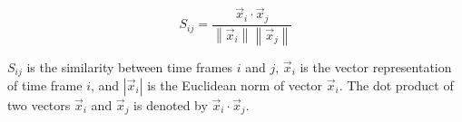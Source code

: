 \begin{equation}
S_{ij} = \frac{\vec{x}_i \cdot \vec{x}_j}{\left\| \vec{x}_i \right\| \left\| \vec{x}_j \right\|}
\end{equation}

$S_{ij}$ is the similarity between time frames $i$ and $j$, $\vec{x}_i$ is the vector representation of time frame $i$, and $\left| \vec{x}_i \right|$ is the Euclidean norm of vector $\vec{x}_i$. The dot product of two vectors $\vec{x}_i$ and $\vec{x}_j$ is denoted by $\vec{x}_i \cdot \vec{x}_j$.